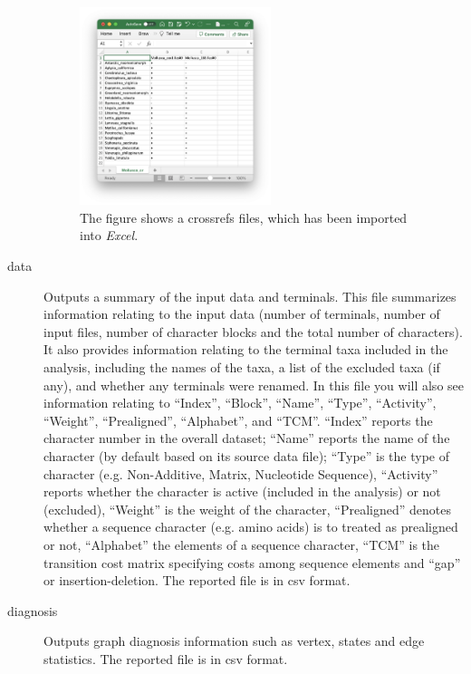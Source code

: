 \begin{description}
		\begin{figure}
		\centering
		\includegraphics[width=0.55\textwidth]{crossrefs1.png}
		\caption{The figure shows a crossrefs files, which has been imported into \textit{Excel}.}
		\label{crossrefs}
		\end{figure}
			
		\item[data] Outputs a summary of the input data and terminals. This file summarizes 
		information relating to the input data (number of terminals, number of input files, 
		number of character blocks and the total number of characters). It also provides
		information relating to the terminal taxa included in the analysis, including the 
		names of the taxa, a list of the excluded taxa (if any), and whether any terminals 
		were renamed. In this file you will also see information relating to ``Index'', ``Block'', 
		``Name'', ``Type'', ``Activity'', ``Weight'', ``Prealigned'', ``Alphabet'', and ``TCM''. 
		``Index'' reports the character number in the overall dataset; ``Name'' reports the 
		name of the character (by default based on its source data file); ``Type'' is the type 
		of character (e.g. Non-Additive, Matrix, Nucleotide Sequence), ``Activity'' reports 
		whether the character is active (included in the analysis) or not (excluded), 
		``Weight'' is the weight of the character, ``Prealigned''  denotes whether a 
		sequence character (e.g. amino acids) is to treated as prealigned or not, 
		``Alphabet'' the elements of a sequence character, ``TCM'' is the transition cost 
		matrix specifying costs among sequence elements and ``gap'' or insertion-deletion.
		The reported file is in csv format.
	
		\item[diagnosis] Outputs graph diagnosis information such as vertex, states and edge 
		statistics. The reported file is in csv format. 
		

\end{description}
